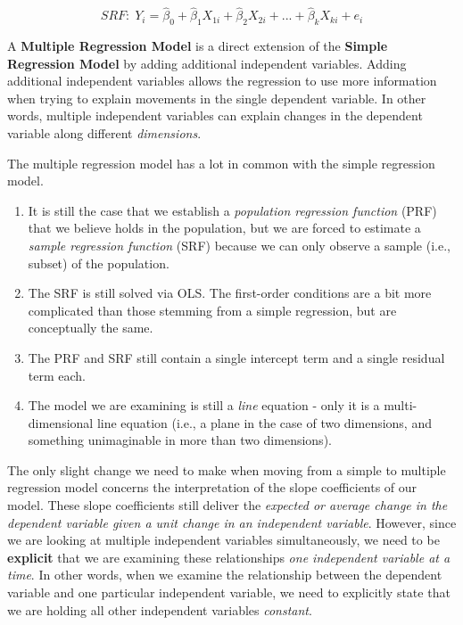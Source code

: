 \documentclass[
]{book}
\begin{document}
\[SRF:\;Y_i=\hat{\beta}_0+\hat{\beta}_1X_{1i}+\hat{\beta}_2X_{2i}+...+\hat{\beta}_kX_{ki}+e_i\]

A \textbf{Multiple Regression Model} is a direct extension of the \textbf{Simple Regression Model} by adding additional independent variables. Adding additional independent variables allows the regression to use more information when trying to explain movements in the single dependent variable. In other words, multiple independent variables can explain changes in the dependent variable along different \emph{dimensions}.

The multiple regression model has a lot in common with the simple regression model.

\begin{enumerate}
\def\labelenumi{\arabic{enumi}.}
\item
  It is still the case that we establish a \emph{population regression function} (PRF) that we believe holds in the population, but we are forced to estimate a \emph{sample regression function} (SRF) because we can only observe a sample (i.e., subset) of the population.
\item
  The SRF is still solved via OLS. The first-order conditions are a bit more complicated than those stemming from a simple regression, but are conceptually the same.
\item
  The PRF and SRF still contain a single intercept term and a single residual term each.
\item
  The model we are examining is still a \emph{line} equation - only it is a multi-dimensional line equation (i.e., a plane in the case of two dimensions, and something unimaginable in more than two dimensions).
\end{enumerate}

The only slight change we need to make when moving from a simple to multiple regression model concerns the interpretation of the slope coefficients of our model. These slope coefficients still deliver the \emph{expected or average change in the dependent variable given a unit change in an independent variable}. However, since we are looking at multiple independent variables simultaneously, we need to be \textbf{explicit} that we are examining these relationships \emph{one independent variable at a time}. In other words, when we examine the relationship between the dependent variable and one particular independent variable, we need to explicitly state that we are holding all other independent variables \emph{constant}.
\end{document}
